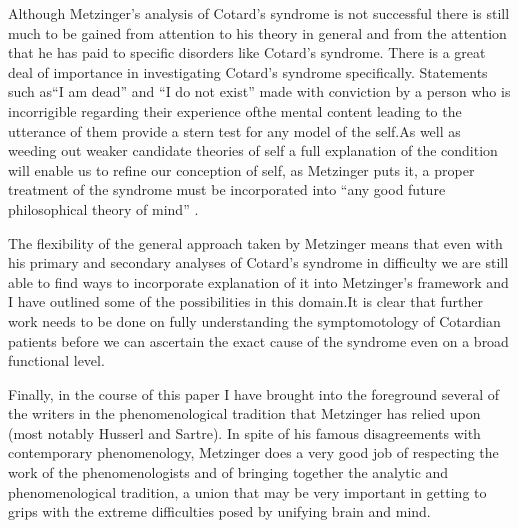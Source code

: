Although Metzinger's analysis of Cotard's syndrome is not successful there is still much to be gained from attention to his theory in general and from the attention that he has paid to specific disorders like Cotard's syndrome. There is a great deal of importance in investigating Cotard's syndrome specifically. Statements such as“I am dead” and “I do not exist” made with conviction by a person who is incorrigible regarding their experience ofthe mental content leading to the utterance of them provide a stern test for any model of the self.As well as weeding out weaker candidate theories of self a full explanation of the condition will enable us to refine our conception of self, as Metzinger puts it, a proper treatment of the syndrome must be incorporated into “any good future philosophical theory of mind” \cite[p. 455]{metzinger2003}.

The flexibility of the general approach taken by Metzinger means that even with his primary and secondary analyses of Cotard's syndrome in difficulty we are still able to find ways to incorporate explanation of it into Metzinger's framework and I have outlined some of the possibilities in this domain.It is clear that further work needs to be done on fully understanding the symptomotology of Cotardian patients before we can ascertain the exact cause of the syndrome even on a broad functional level.

Finally, in the course of this paper I have brought into the foreground several of the writers in the phenomenological tradition that Metzinger has relied upon (most notably Husserl and Sartre). In spite of his famous disagreements with contemporary phenomenology, Metzinger does a very good job of respecting the work of the phenomenologists and of bringing together the analytic and phenomenological tradition, a union that may be very important in getting to grips with the extreme difficulties posed by unifying brain and mind.